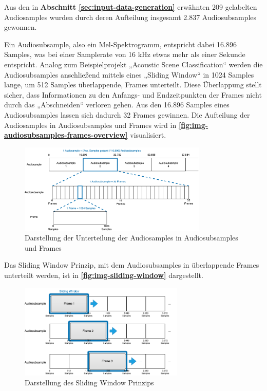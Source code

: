 Aus den in \textbf{Abschnitt \ref{sec:input-data-generation} }erwähnten 209 gelabelten Audiosamples wurden durch deren Aufteilung insgesamt 2.837 Audiosubsamples gewonnen.

Ein Audiosubsample, also ein Mel-Spektrogramm, entspricht dabei 16.896 Samples, was bei einer Samplerate von 16 kHz etwas mehr als einer Sekunde entspricht. Analog zum Beispielprojekt „Acoustic Scene Classification“ \cite{stm-asc}\cite{stm-asc-2} werden die Audiosubsamples anschließend mittels eines „Sliding Window“ in 1024 Samples lange, um 512 Samples überlappende, Frames unterteilt.  Diese Überlappung stellt sicher, dass Informationen zu den Anfangs- und Endzeitpunkten der Frames nicht durch das „Abschneiden“ verloren gehen. Aus den 16.896 Samples eines Audiosubsamples lassen sich dadurch 32 Frames gewinnen. Die Aufteilung der Audiosamples in Audiosubsamples und Frames wird in \textbf{\autoref{fig:img-audiosubsamples-frames-overview}} visualisiert.

\begin{figure}[h!]
\centering
\includegraphics[width=0.8\textwidth]{images/08_durchfuehrung/nn/audiosubsamples_frames_overview.png}
\caption{Darstellung der Unterteilung der Audiosamples in Audiosubsamples und Frames}
\label{fig:img-audiosubsamples-frames-overview}
\end{figure}

Das Sliding Window Prinzip, mit dem Audiosubsamples in überlappende Frames unterteilt werden, ist in \textbf{\autoref{fig:img-sliding-window}} dargestellt.

\begin{figure}[h!]
\centering
\includegraphics[width=0.7\textwidth]{images/08_durchfuehrung/nn/sliding_window.png}
\caption{Darstellung des Sliding Window Prinzips}
\label{fig:img-sliding-window}
\end{figure}

